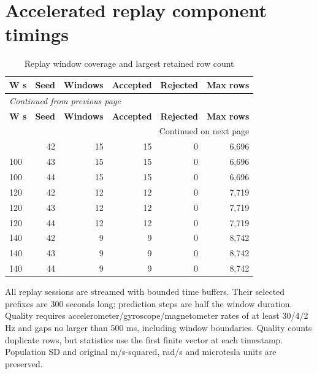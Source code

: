 \documentclass[10pt,a4paper]{article}
\begin{document}
\section{Accelerated replay component timings}
\begingroup\small\setlength{\tabcolsep}{4pt}\renewcommand{\arraystretch}{1.12}
\begin{longtable}{@{}lrrrrr@{}}
\caption{Replay window coverage and largest retained row count}\\
\toprule
\textbf{W s} & \textbf{Seed} & \textbf{Windows} & \textbf{Accepted} & \textbf{Rejected} & \textbf{Max rows} \\
\midrule\endfirsthead
\multicolumn{6}{l}{\small\itshape Continued from previous page}\\
\toprule
\textbf{W s} & \textbf{Seed} & \textbf{Windows} & \textbf{Accepted} & \textbf{Rejected} & \textbf{Max rows} \\
\midrule\endhead
\midrule\multicolumn{6}{r}{\small Continued on next page}\\\endfoot
\bottomrule\endlastfoot
100 & 42 & 15 & 15 & 0 & 6,696 \\
100 & 43 & 15 & 15 & 0 & 6,696 \\
100 & 44 & 15 & 15 & 0 & 6,696 \\
120 & 42 & 12 & 12 & 0 & 7,719 \\
120 & 43 & 12 & 12 & 0 & 7,719 \\
120 & 44 & 12 & 12 & 0 & 7,719 \\
140 & 42 & 9 & 9 & 0 & 8,742 \\
140 & 43 & 9 & 9 & 0 & 8,742 \\
140 & 44 & 9 & 9 & 0 & 8,742 \\
\end{longtable}\endgroup
All replay sessions are streamed with bounded time buffers. Their selected prefixes are 300 seconds long; prediction steps are half the window duration. Quality requires accelerometer/\allowbreak{}gyroscope/\allowbreak{}magnetometer rates of at least 30/\allowbreak{}4/\allowbreak{}2 Hz and gaps no larger than 500 ms, including window boundaries. Quality counts duplicate rows, but statistics use the first finite vector at each timestamp. Population SD and original m/\allowbreak{}s-squared, rad/\allowbreak{}s and microtesla units are preserved.
\end{document}
